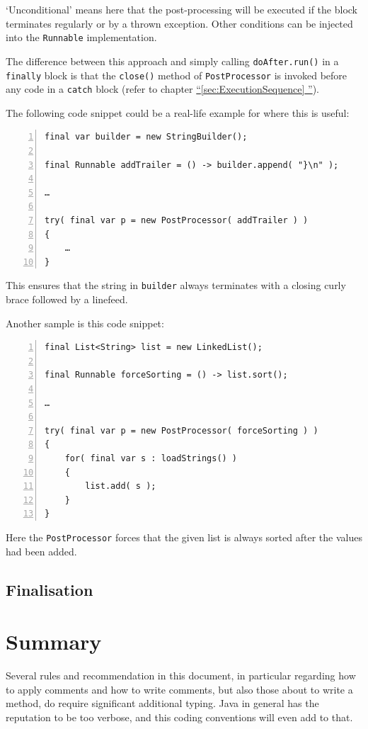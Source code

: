 \documentclass[12pt,a4paper,titlepage, parskip=half, headsepline, footsepline, cleardoubleplain]{scrbook}
\newcommand*{\tqfullref}[1]{\hyperref[{#1}]{“\ref*{#1} \nameref*{#1}”}}
\begin{document}
‘Unconditional’ means here that the post-processing will be executed if the block terminates regularly or by a thrown exception. Other conditions can be injected into the \lstinline|Runnable| implementation.

The difference between this approach and simply calling \lstinline|doAfter.run()| in a \lstinline|finally| block is that the \lstinline|close()| method of \lstinline|PostProcessor| is invoked before any code in a \lstinline|catch| block (refer to chapter \tqfullref{sec:ExecutionSequence}).

The following code snippet could be a real-life example for where this is useful:
\begin{lstlisting}[numbers=left]
final var builder = new StringBuilder();

final Runnable addTrailer = () -> builder.append( "}\n" );

…

try( final var p = new PostProcessor( addTrailer ) )
{
    …
}
\end{lstlisting}
This ensures that the string in \lstinline|builder| always terminates with a closing curly brace followed by a linefeed.

Another sample is this code snippet:
\begin{lstlisting}[numbers=left]
final List<String> list = new LinkedList();

final Runnable forceSorting = () -> list.sort();

…

try( final var p = new PostProcessor( forceSorting ) )
{
    for( final var s : loadStrings() )
    {
        list.add( s );
    }
}
\end{lstlisting}
Here the \lstinline|PostProcessor| forces that the given list is always sorted after the values had been added.

\section{Finalisation}

\chapter{Summary}
Several rules and recommendation in this document, in particular regarding how to apply comments and how to write comments, but also those about to write a method, do require significant additional typing. Java in general has the reputation to be too verbose, and this coding conventions will even add to that.
\end{document}
